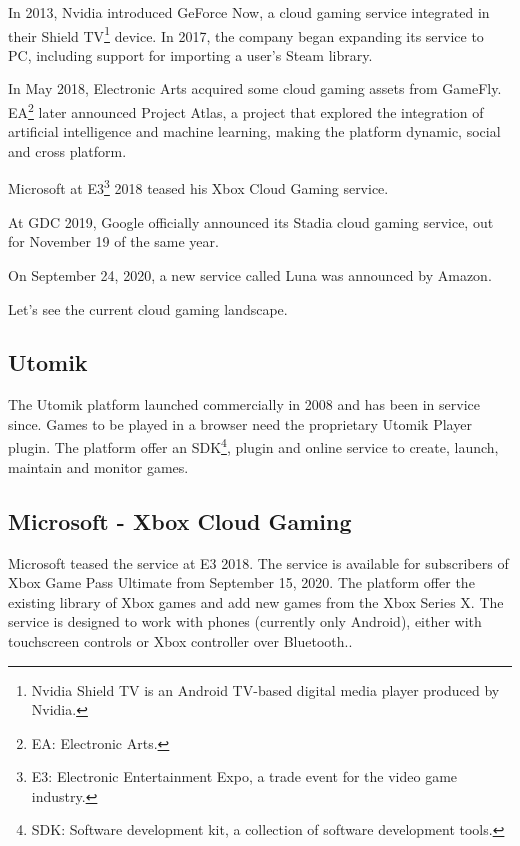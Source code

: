In 2013, Nvidia introduced GeForce Now, a cloud gaming service integrated in their Shield TV\footnote{Nvidia Shield TV is an Android TV-based digital media player produced by Nvidia.} device. In 2017, the company began expanding its service to PC, including support for importing a user's Steam library.

In May 2018, Electronic Arts acquired some cloud gaming assets from GameFly. EA\footnote{EA: Electronic Arts.} later announced Project Atlas, a project that explored the integration of artificial intelligence and machine learning, making the platform dynamic, social and cross platform.

Microsoft at E3\footnote{E3: Electronic Entertainment Expo, a trade event for the video game industry.} 2018 teased his Xbox Cloud Gaming service.

At GDC 2019, Google officially announced its Stadia cloud gaming service, out for November 19 of the same year.

On September 24, 2020, a new service called Luna was announced by Amazon\cite{Cloud_gaming_history}.

Let's see the current cloud gaming landscape.

\subsection{Utomik}
The Utomik platform launched commercially in 2008 and has been in service since. Games to be played in a browser need the proprietary Utomik Player plugin. The platform offer an SDK\footnote{SDK: Software development kit, a collection of software development tools.}, plugin and online service to create, launch, maintain and monitor games\cite{Utomik}.

\subsection{Microsoft - Xbox Cloud Gaming}
Microsoft teased the service at E3 2018. The service is available for subscribers of Xbox Game Pass Ultimate from September 15, 2020. The platform offer the existing library of Xbox games and add new games from the Xbox Series X. The service is designed to work with phones (currently only Android), either with touchscreen controls or Xbox controller over Bluetooth.\cite{Xbox_Game_Pass_cloud_gaming}.

